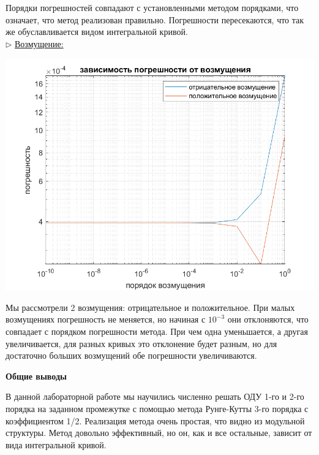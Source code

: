 \documentclass{article}
\begin{document}
	Порядки погрешностей совпадают с установленными методом порядками, что означает, что метод реализован правильно. Погрешности пересекаются, что так же обуславливается видом интегральной кривой.\\
	$\triangleright$ \underline{Возмущение:}
	\begin{center} \includegraphics[scale = 0.6]{возмущение} \end{center}
	Мы рассмотрели 2 возмущения: отрицательное и положительное. При малых возмущениях погрешность не меняется, но начиная с $10^{-3}$ они отклоняются, что совпадает с порядком погрешности метода. При чем одна уменьшается, а другая увеличивается, для разных кривых это отклонение будет разным, но для достаточно больших возмущений обе погрешности увеличиваются.
	\begin{center} \textbf{Общие выводы}\end{center}
	В данной лабораторной работе мы научились численно решать ОДУ 1-го и 2-го порядка на заданном промежутке с помощью метода Рунге-Кутты 3-го порядка с коэффициентом 1/2. Реализация метода очень простая, что видно из модульной структуры. Метод довольно эффективный, но он, как и все остальные, зависит от вида интегральной кривой.
\end{document}
